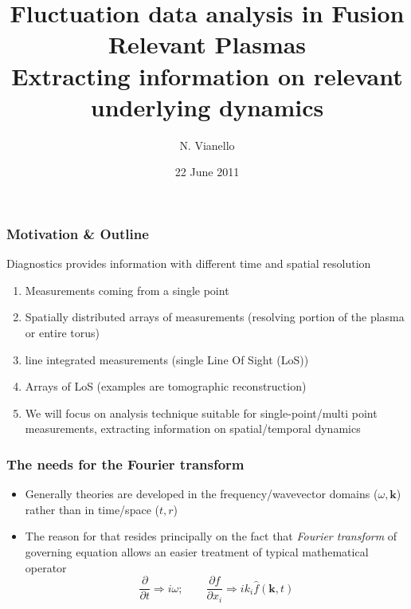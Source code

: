 \documentclass[t,10pt]{beamer}
\title{Fluctuation data analysis in Fusion Relevant Plasmas\\
{\small Extracting information on relevant underlying dynamics}}
\author{N. Vianello }
\date{22 June 2011}
\begin{document}
\begin{titleframe}
\end{titleframe}

\begin{frame}
\frametitle{Motivation \& Outline}
Diagnostics provides information with different time and spatial resolution
\begin{enumerate}[<+-|alert@+>]
\item Measurements coming from a single point  
\item Spatially distributed arrays of measurements (resolving portion
  of the plasma or entire torus)
\item line integrated measurements (single Line Of Sight (LoS)) 
\item Arrays of LoS (examples are tomographic reconstruction)
\item We will focus on analysis technique suitable for
  single-point/multi point measurements, extracting information on
  spatial/temporal dynamics
\end{enumerate}
\end{frame}

\begin{frame}
\frametitle{ The needs for the Fourier transform}
\begin{itemize}[<+-|alert@+>]
\item Generally theories are developed in the frequency/wavevector
  domains ($\omega,\mathbf{k}$) rather than in time/space ($t,r$)
\item The reason for that resides principally on the fact that
  \emph{Fourier transform} of governing equation allows an easier
  treatment of typical mathematical operator
\begin{equation*}
\frac{\partial}{\partial t} \Longrightarrow i\omega; \qquad
\frac{\partial f}{\partial x_i} \Longrightarrow i k_i \hat{f}(\mathbf{k},t)
\end{equation*}
\end{itemize}
\end{frame}
\end{document}
